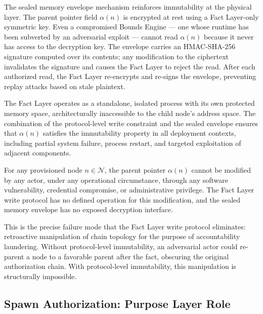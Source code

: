 The sealed memory envelope mechanism reinforces immutability at the physical layer. The parent pointer field $\alpha(n)$ is encrypted at rest using a Fact Layer-only symmetric key. Even a compromised Bounds Engine --- one whose runtime has been subverted by an adversarial exploit --- cannot read $\alpha(n)$ because it never has access to the decryption key. The envelope carries an HMAC-SHA-256 signature computed over its contents; any modification to the ciphertext invalidates the signature and causes the Fact Layer to reject the read. After each authorized read, the Fact Layer re-encrypts and re-signs the envelope, preventing replay attacks based on stale plaintext.

The Fact Layer operates as a standalone, isolated process with its own protected memory space, architecturally inaccessible to the child node's address space. The combination of the protocol-level write constraint and the sealed envelope ensures that $\alpha(n)$ satisfies the immutability property in all deployment contexts, including partial system failure, process restart, and targeted exploitation of adjacent components.

\begin{prop}
\label{prop:protocol-level-immutability}
For any provisioned node $n \in \mathcal{N}$, the parent pointer $\alpha(n)$ cannot be modified by any actor, under any operational circumstance, through any software vulnerability, credential compromise, or administrative privilege. The Fact Layer write protocol has no defined operation for this modification, and the sealed memory envelope has no exposed decryption interface.
\end{prop}

This is the precise failure mode that the Fact Layer write protocol eliminates: retroactive manipulation of chain topology for the purpose of accountability laundering. Without protocol-level immutability, an adversarial actor could re-parent a node to a favorable parent after the fact, obscuring the original authorization chain. With protocol-level immutability, this manipulation is structurally impossible.

\subsection{Spawn Authorization: Purpose Layer Role}
\label{sec:purpose-layer-spawn-authorization}

